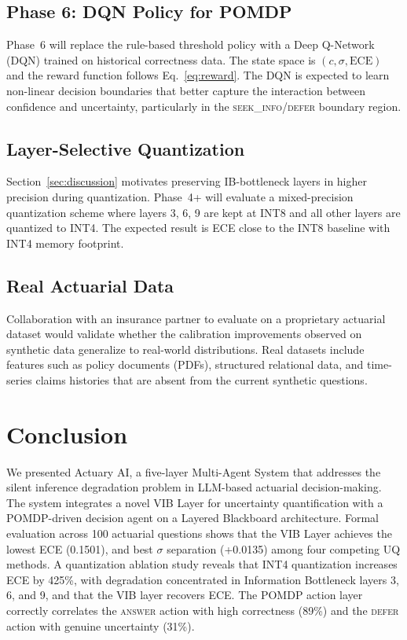 \documentclass[conference]{IEEEtran}
\begin{document}
\subsection{Phase 6: DQN Policy for POMDP}

Phase~6 will replace the rule-based threshold policy with a Deep
Q-Network (DQN) trained on historical correctness data. The state
space is $(c, \sigma, \text{ECE})$ and the reward function follows
Eq.~\ref{eq:reward}. The DQN is expected to learn non-linear
decision boundaries that better capture the interaction between
confidence and uncertainty, particularly in the
\textsc{seek\_info}/\textsc{defer} boundary region.

\subsection{Layer-Selective Quantization}

Section~\ref{sec:discussion} motivates preserving IB-bottleneck layers
in higher precision during quantization. Phase~4+ will evaluate a
mixed-precision quantization scheme where layers 3, 6, 9 are kept at
INT8 and all other layers are quantized to INT4. The expected
result is ECE close to the INT8 baseline with INT4 memory footprint.

\subsection{Real Actuarial Data}

Collaboration with an insurance partner to evaluate on a proprietary
actuarial dataset would validate whether the calibration improvements
observed on synthetic data generalize to real-world distributions.
Real datasets include features such as policy documents (PDFs),
structured relational data, and time-series claims histories that
are absent from the current synthetic questions.

\section{Conclusion}
\label{sec:conclusion}

We presented Actuary AI, a five-layer Multi-Agent System that addresses
the silent inference degradation problem in LLM-based actuarial
decision-making. The system integrates a novel VIB Layer for
uncertainty quantification with a POMDP-driven decision agent on a
Layered Blackboard architecture. Formal evaluation across 100 actuarial
questions shows that the VIB Layer achieves the lowest ECE (0.1501),
and best $\sigma$ separation (+0.0135) among
four competing UQ methods. A quantization ablation study reveals that
INT4 quantization increases ECE by 425\%, with degradation concentrated
in Information Bottleneck layers 3, 6, and 9, and that the VIB layer
recovers ECE. The POMDP action layer correctly
correlates the \textsc{answer} action with high correctness (89\%) and
the \textsc{defer} action with genuine uncertainty (31\%).
\end{document}
